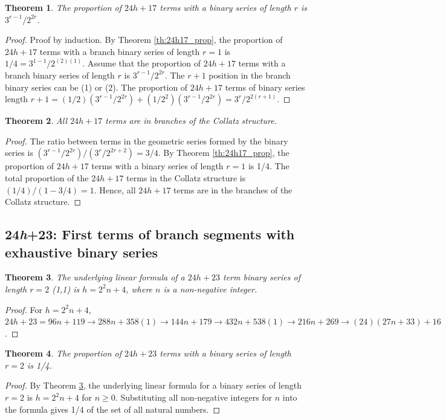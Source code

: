 \documentclass[sn-mathphys-num, pdflatex]{sn-jnl}
\newtheorem{theorem}{Theorem}[section]
\begin{document}
\begin{theorem}
    The proportion of $24h+17$ terms with a binary series of length $r$ is $3^{r-1}/2^{2r}$.
\end{theorem}
\begin{proof}
    Proof by induction.
    By Theorem \ref{th:24h17_prop}, the proportion of $24h+17$ terms with a branch binary series of length $r=1$ is $1/4 = 3^{1-1}/2^{(2)(1)}$.
    Assume that the proportion of $24h+17$ terms with a branch binary series of length $r$ is $3^{r-1}/2^{2r}$.
    The $r+1$ position in the branch binary series can be (1) or (2).
    The proportion of $24h+17$ terms of binary series length $r+1 = (1/2)(3^{r-1}/2^{2r})+(1/2^2)(3^{r-1}/2^{2r}) = 3^r/2^{2(r+1)}$. 
\end{proof}

\begin{theorem}\label{th:24h17_final}
    All $24h+17$ terms are in branches of the Collatz structure.
\end{theorem}
\begin{proof}
    The ratio between terms in the geometric series formed by the binary series is $(3^{r-1}/2^{2r}) / (3^r/2^{2r+2}) = 3/4$.
    By Theorem \ref{th:24h17_prop}, the proportion of $24h+17$ terms with a binary series of length $r=1$ is 1/4.
    The total proportion of the $24h+17$ terms in the Collatz structure is $(1/4)/(1 - 3/4) = 1$.
    Hence, all $24h+17$ terms are in the branches of the Collatz structure.
\end{proof}

\subsection{24\textit{h}+23: First terms of branch segments with exhaustive binary series}\label{sec6.9}
\begin{theorem}\label{th:24h23_base}
    The underlying linear formula of a $24h+23$ term binary series of length $r=2$ (1,1) is $h=2^2n+4$, where $n$ is a non-negative integer.
\end{theorem}
\begin{proof}
    For $h=2^2n+4$, $24h+23=96n+119\to 288n+358(1)\to 144n+179\to 432n+538(1)\to 216n+269\to (24)(27n+33)+16$.
\end{proof}

\begin{theorem}\label{th:24h23_prop}
    The proportion of $24h+23$ terms with a binary series of length $r=2$ is 1/4.
\end{theorem}
\begin{proof}
    By Theorem \ref{th:24h23_base}, the underlying linear formula for a binary series of length $r=2$ is $h=2^2n+4$ for $n \ge 0$. Substituting all non-negative integers for $n$ into the formula gives 1/4 of the set of all natural numbers.
\end{proof}
\end{document}
